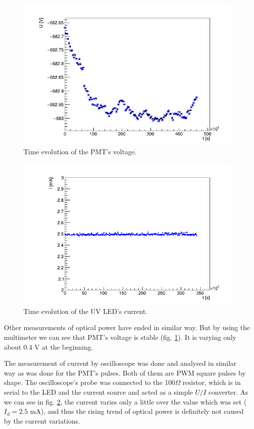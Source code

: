 \begin{figure}[H]
 \centering
 \includegraphics[scale=0.5]{./pictures/voltage}
 \caption{Time evolution of the PMT's voltage.}
 \label{PMTVolt}
\end{figure}

\begin{figure}[H]
 \centering
 \includegraphics[scale=0.5]{./pictures/Current}
 \caption{Time evolution of the UV LED's current.}
 \label{LEDCurrent}
\end{figure}

Other measurements of optical power have ended in similar way. But by using the multimeter we can see that PMT's voltage is stable (fig. \ref{PMTVolt}). It is varying only about 0.4 V at the beginning.
\par
The measurement of current by oscilloscope was done and analysed in similar way as was done for the PMT's pulses. Both of them are PWM square pulses by shape. The oscilloscope's probe was connected to the 100$\Omega$ resistor, which is in serial to the LED and the current source and acted as a simple $U/I$ converter. As we can see in fig. \ref{LEDCurrent}, the current varies only a little over the value which was set ($I_\textrm{d} = 2.5$ mA), and thus the rising trend of optical power is definitely not caused by the current variations.

